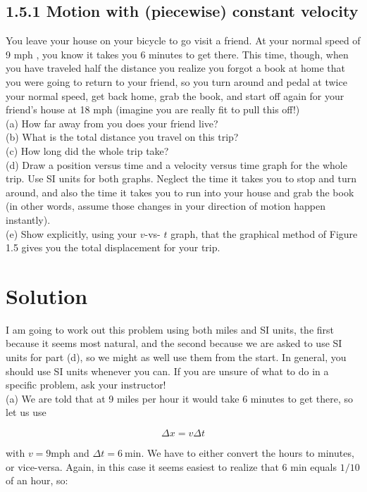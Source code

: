 \documentclass[10pt]{article}
\begin{document}
\subsection*{1.5.1 Motion with (piecewise) constant velocity}
You leave your house on your bicycle to go visit a friend. At your normal speed of 9 mph , you know it takes you 6 minutes to get there. This time, though, when you have traveled half the distance you realize you forgot a book at home that you were going to return to your friend, so you turn around and pedal at twice your normal speed, get back home, grab the book, and start off again for your friend's house at 18 mph (imagine you are really fit to pull this off!)\\
(a) How far away from you does your friend live?\\
(b) What is the total distance you travel on this trip?\\
(c) How long did the whole trip take?\\
(d) Draw a position versus time and a velocity versus time graph for the whole trip. Use SI units for both graphs. Neglect the time it takes you to stop and turn around, and also the time it takes you to run into your house and grab the book (in other words, assume those changes in your direction of motion happen instantly).\\
(e) Show explicitly, using your $v$-vs- $t$ graph, that the graphical method of Figure 1.5 gives you the total displacement for your trip.

\section*{Solution}
I am going to work out this problem using both miles and SI units, the first because it seems most natural, and the second because we are asked to use SI units for part (d), so we might as well use them from the start. In general, you should use SI units whenever you can. If you are unsure of what to do in a specific problem, ask your instructor!\\
(a) We are told that at 9 miles per hour it would take 6 minutes to get there, so let us use


\begin{equation*}
\Delta x=v \Delta t \tag{1.22}
\end{equation*}


with $v=9 \mathrm{mph}$ and $\Delta t=6 \mathrm{~min}$. We have to either convert the hours to minutes, or vice-versa. Again, in this case it seems easiest to realize that 6 min equals $1 / 10$ of an hour, so:
\end{document}
